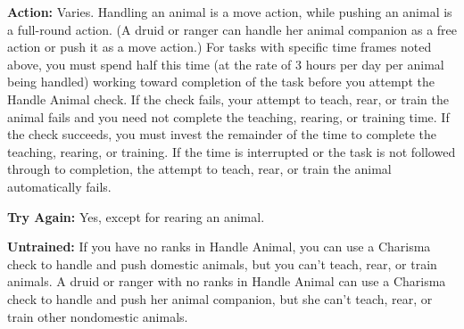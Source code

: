 \textbf{Action:} Varies. Handling an animal is a move action, while pushing an animal is a full-round action. (A druid or ranger can handle her animal companion as a free action or push it as a move action.) For tasks with specific time frames noted above, you must spend half this time (at the rate of 3 hours per day per animal being handled) working toward completion of the task before you attempt the Handle Animal check. If the check fails, your attempt to teach, rear, or train the animal fails and you need not complete the teaching, rearing, or training time. If the check succeeds, you must invest the remainder of the time to complete the teaching, rearing, or training. If the time is interrupted or the task is not followed through to completion, the attempt to teach, rear, or train the animal automatically fails.

\textbf{Try Again:} Yes, except for rearing an animal.

\textbf{Untrained:} If you have no ranks in Handle Animal, you can use a Charisma check to handle and push domestic animals, but you can't teach, rear, or train animals. A druid or ranger with no ranks in Handle Animal can use a Charisma check to handle and push her animal companion, but she can't teach, rear, or train other nondomestic animals.
